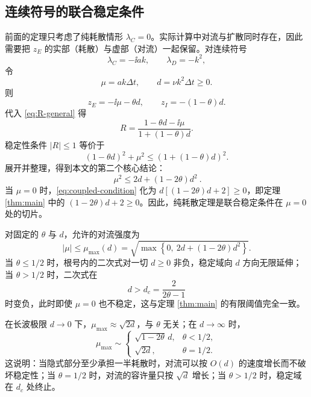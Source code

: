 \subsection{连续符号的联合稳定条件}

前面的定理只考虑了纯耗散情形 $\lambda_C=0$。实际计算中对流与扩散同时存在，因此需要把 $z_E$ 的实部（耗散）与虚部（对流）一起保留。对连续符号
\begin{equation}
  \lambda_C=-\ii ak,\qquad \lambda_D=-k^2,
\end{equation}
令
\begin{equation}
  \mu=ak\Delta t,\qquad d=\nu k^2\Delta t\ge0.
  \label{eq:mu-d}
\end{equation}
则
\begin{equation}
  z_E=-\ii\mu-\theta d,\qquad z_I=-(1-\theta)d.
  \label{eq:zE-continuous}
\end{equation}
代入 \eqref{eq:R-general} 得
\begin{equation}
  R=\frac{1-\theta d-\ii\mu}{1+(1-\theta)d}.
  \label{eq:R-continuous}
\end{equation}
稳定性条件 $|R|\le1$ 等价于
\begin{equation}
  (1-\theta d)^2+\mu^2\le\left(1+(1-\theta)d\right)^2.
  \label{eq:continuous-ineq}
\end{equation}
展开并整理，得到本文的第二个核心结论：
\begin{equation}
  \boxed{\ \mu^2\le 2d+(1-2\theta)d^2\ }.
  \label{eq:coupled-condition}
\end{equation}
当 $\mu=0$ 时，\eqref{eq:coupled-condition} 化为 $d[(1-2\theta)d+2]\ge0$，即定理 \ref{thm:main} 中的 $(1-2\theta)d+2\ge0$。因此，纯耗散定理是联合稳定条件在 $\mu=0$ 处的切片。

对固定的 $\theta$ 与 $d$，允许的对流强度为
\begin{equation}
  |\mu|\le\mu_{\max}(d)
  =\sqrt{\max\left\{0,\ 2d+(1-2\theta)d^2\right\}}.
  \label{eq:mu-max}
\end{equation}
当 $\theta\le1/2$ 时，根号内的二次式对一切 $d\ge0$ 非负，稳定域向 $d$ 方向无限延伸；当 $\theta>1/2$ 时，二次式在
\begin{equation}
  d>d_c=\frac{2}{2\theta-1}
  \label{eq:dc}
\end{equation}
时变负，此时即使 $\mu=0$ 也不稳定，这与定理 \ref{thm:main} 的有限阈值完全一致。

在长波极限 $d\to0$ 下，$\mu_{\max}\approx\sqrt{2d}$，与 $\theta$ 无关；在 $d\to\infty$ 时，
\begin{equation}
  \mu_{\max}\sim
  \begin{cases}
    \sqrt{1-2\theta}\,d, & \theta<1/2,\\[4pt]
    \sqrt{2d}, & \theta=1/2.
  \end{cases}
  \label{eq:mu-asymptotic}
\end{equation}
这说明：当隐式部分至少承担一半耗散时，对流可以按 $O(d)$ 的速度增长而不破坏稳定性；当 $\theta=1/2$ 时，对流的容许量只按 $\sqrt d$ 增长；当 $\theta>1/2$ 时，稳定域在 $d_c$ 处终止。

